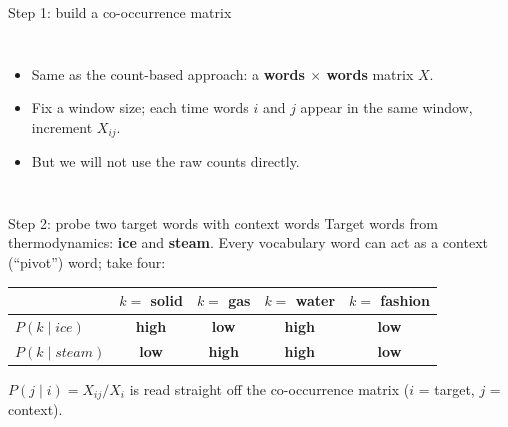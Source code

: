 \documentclass[aspectratio=169,11pt]{beamer}
\newcommand{\hi}{\textcolor{okc}{\textbf{high}}}
\newcommand{\lo}{\textcolor{warn}{\textbf{low}}}
\begin{document}
\begin{frame}{Step 1: build a co-occurrence matrix}
\begin{columns}[c]
\begin{itemize}
  \item Same as the count-based approach: a \textbf{words $\times$ words}
        matrix $X$.
  \item Fix a window size; each time words $i$ and $j$ appear in the same
        window, increment $X_{ij}$.
  \item But we will \alert{not use the raw counts} directly.
\end{itemize}
\centering
{}
\end{columns}
\end{frame}

\begin{frame}{Step 2: probe two target words with context words}
\small
Target words from thermodynamics: \textbf{ice} and \textbf{steam}.
Every vocabulary word can act as a context (``pivot'') word; take four:

\vspace{3mm}
\centering
\begin{tabular}{@{}lcccc@{}}
\toprule
 & $k=$ solid & $k=$ gas & $k=$ water & $k=$ fashion \\
\midrule
$P(k \mid \textit{ice})$   & \hi & \lo & \hi & \lo \\
$P(k \mid \textit{steam})$ & \lo & \hi & \hi & \lo \\
\bottomrule
\end{tabular}

\vspace{4mm}
\raggedright
$P(j \mid i) = X_{ij} / X_i$ is read straight off the co-occurrence matrix
($i$ = target, $j$ = context).
\end{frame}
\end{document}
